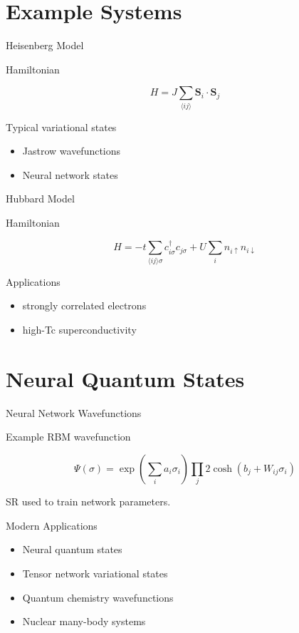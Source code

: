 \documentclass{beamer}
\begin{document}
\section{Example Systems}

\begin{frame}{Heisenberg Model}

Hamiltonian

\[
H = J\sum_{\langle ij\rangle}
\mathbf{S}_i\cdot\mathbf{S}_j
\]

Typical variational states

\begin{itemize}
\item Jastrow wavefunctions
\item Neural network states
\end{itemize}
\end{frame}

\begin{frame}{Hubbard Model}

Hamiltonian

\[
H =
-t\sum_{\langle ij\rangle\sigma}
c^\dagger_{i\sigma}c_{j\sigma}
+
U\sum_i n_{i\uparrow}n_{i\downarrow}
\]

Applications

\begin{itemize}
\item strongly correlated electrons
\item high-Tc superconductivity
\end{itemize}
\end{frame}

\section{Neural Quantum States}

\begin{frame}{Neural Network Wavefunctions}

Example RBM wavefunction

\[
\Psi(\sigma)
=
\exp(\sum_i a_i\sigma_i)
\prod_j 2\cosh(b_j + W_{ij}\sigma_i)
\]

SR used to train network parameters.
\end{frame}

\begin{frame}{Modern Applications}

\begin{itemize}
\item Neural quantum states
\item Tensor network variational states
\item Quantum chemistry wavefunctions
\item Nuclear many-body systems
\end{itemize}
\end{frame}
\end{document}
